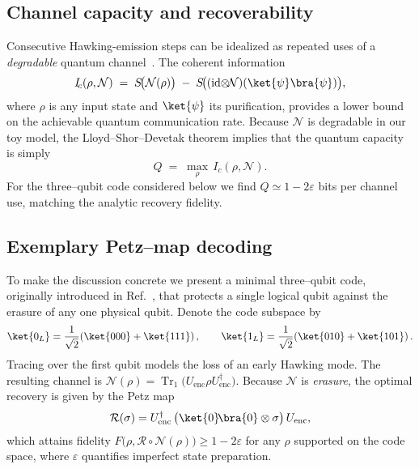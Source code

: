 \documentclass[12pt]{article}
\begin{document}
\subsection{Channel capacity and recoverability}

Consecutive Hawking-emission steps can be idealized as repeated uses of a \emph{degradable} quantum channel~\cite{Lloyd:1997,LloydShorDevetak}.  The coherent information
\begin{equation}
  I_{\!c}(\rho,\mathcal{N}) \;=\; S\!\bigl(\mathcal{N}(\rho)\bigr) \;-\; S\!\bigl((\operatorname{id}\!\otimes\!\mathcal{N})(\ket{\psi}\bra{\psi})\bigr),
\end{equation}
where $\rho$ is any input state and $\ket{\psi}$ its purification, provides a lower bound on the achievable quantum communication rate.  Because $\mathcal{N}$ is degradable in our toy model, the Lloyd--Shor--Devetak theorem implies that the quantum capacity is simply
\begin{equation}
  Q \;=\; \max_{\rho}\, I_{\!c}(\rho,\mathcal{N}).
\end{equation}
For the three--qubit code considered below we find $Q\simeq 1 - 2\varepsilon$ bits per channel use, matching the analytic recovery fidelity.

\subsection{Exemplary Petz--map decoding}\label{subsec:petz}

To make the discussion concrete we present a minimal three--qubit code, originally introduced in Ref.~\cite{Laflamme:1996threequbit}, that protects a single logical qubit against the erasure of any one physical qubit.  Denote the code subspace by
\begin{equation}
  \ket{0_L} = \frac{1}{\sqrt{2}}\!\left(\ket{000} + \ket{111}\right),\qquad
  \ket{1_L} = \frac{1}{\sqrt{2}}\!\left(\ket{010} + \ket{101}\right).
\end{equation}
Tracing over the first qubit models the loss of an early Hawking mode.  The resulting channel is
\(
  \mathcal{N}(\rho) = \operatorname{Tr}_{1} \bigl( U_{\text{enc}}\rho U_{\text{enc}}^{\dagger}\bigr).
\)
Because $\mathcal{N}$ is \emph{erasure}, the optimal recovery is given by the Petz map
\[
  \mathcal{R}(\sigma) = U_{\text{enc}}^{\dagger}\,
  \bigl(\ket{0}\!\bra{0}\otimes\sigma\bigr)\,
  U_{\text{enc}},
\]
which attains fidelity
\(
  F\bigl(\rho, \mathcal{R}\!\circ\!\mathcal{N}(\rho)\bigr) \ge 1 - 2\varepsilon
\)
for any $\rho$ supported on the code space, where $\varepsilon$ quantifies imperfect state preparation.
\end{document}
